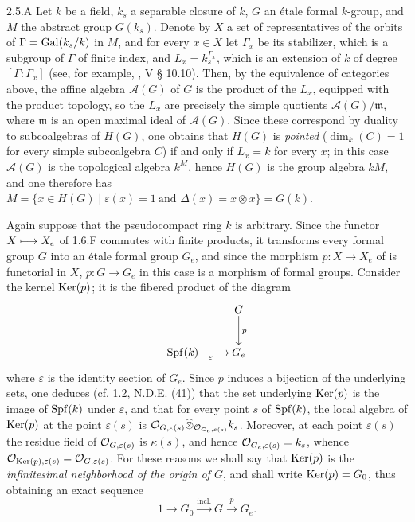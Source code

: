 \begin{remark}{2.5.A}\label{VIIB.2.5.A}
Let $k$ be a field, $k_s$ a separable closure of $k$, $G$ an étale formal $k$-group, and $M$ the abstract group $G(k_s)$. Denote by $X$ a set of representatives of the orbits of $\Gamma=\operatorname{Gal}(k_s/k)$ in $M$, and for every $x\in X$ let $\Gamma_x$ be its stabilizer, which is a subgroup of $\Gamma$ of finite index, and $L_x=k_s^{\Gamma_x}$, which is an extension of $k$ of degree $[\Gamma:\Gamma_x]$ (see, for example, \cite{BAlg}, V § 10.10). Then, by the equivalence of categories above, the affine algebra $\mathscr A(G)$ of $G$ is the product of the $L_x$, equipped with the product topology, so the $L_x$ are precisely the simple quotients $\mathscr A(G)/\mathfrak m$, where $\mathfrak m$ is an open maximal ideal of $\mathscr A(G)$. Since these correspond by duality to subcoalgebras of $H(G)$, one obtains that $H(G)$ is \emph{pointed} (\ie $\dim_k(C)=1$ for every simple subcoalgebra $C$) if and only if $L_x=k$ for every $x$; in this case $\mathscr A(G)$ is the topological algebra $k^M$, hence $H(G)$ is the group algebra $kM$, and one therefore has $M=\{x\in H(G)\mid\varepsilon(x)=1\ \text{and }\Delta(x)=x\otimes x\}=G(k)$.
\end{remark}

Again suppose that the pseudocompact ring $k$ is arbitrary. Since the functor $X\longmapsto X_e$ of 1.6.F commutes with finite products, it transforms every formal group $G$ into an étale formal group $G_e$, and since the morphism $p:X\to X_e$ of \loccit is functorial in $X$, $p:G\to G_e$ in this case is a morphism of formal groups.
Consider the kernel $\operatorname{Ker}(p)$; it is the fibered product of the diagram
\[
\xymatrix{&G\ar[d]^p\\\Spf(k)\ar[r]_\varepsilon&G_e}
\]
where $\varepsilon$ is the identity section of $G_e$. Since $p$ induces a bijection of the underlying sets, one deduces (cf. 1.2, N.D.E. (41)) that the set underlying $\operatorname{Ker}(p)$ is the image of $\operatorname{Spf}(k)$ under $\varepsilon$, and that for every point $s$ of $\operatorname{Spf}(k)$, the local algebra of $\operatorname{Ker}(p)$ at the point $\varepsilon(s)$ is $\mathcal{O}_{G,\varepsilon(s)}\widehat\otimes_{\mathcal{O}_{G_e,\varepsilon(s)}}k_s$. Moreover, at each point $\varepsilon(s)$ the residue field of $\mathcal{O}_{G,\varepsilon(s)}$ is $\kappa(s)$, and hence $\mathcal{O}_{G_e,\varepsilon(s)}=k_s$, whence $\mathcal{O}_{\operatorname{Ker}(p),\varepsilon(s)}=\mathcal{O}_{G,\varepsilon(s)}$. For these reasons we shall say that $\operatorname{Ker}(p)$ is the \emph{infinitesimal neighborhood of the origin of $G$}, and shall write $\operatorname{Ker}(p)=G_0$, thus obtaining an exact sequence
\[
1\to G_0\xrightarrow{\mathrm{incl.}}G\xrightarrow p G_e.
\]
